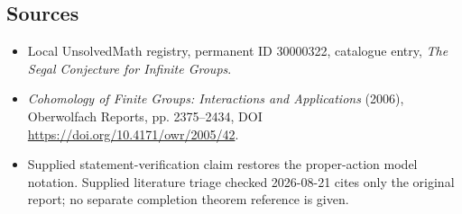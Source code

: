 \documentclass[11pt]{article}
\begin{document}
\subsection{Sources}
\begin{itemize}
\item Local UnsolvedMath registry, permanent ID 30000322, catalogue entry, \emph{The Segal Conjecture for Infinite Groups}.
\item \emph{Cohomology of Finite Groups: Interactions and Applications} (2006), Oberwolfach Reports, pp. 2375--2434, DOI \url{https://doi.org/10.4171/owr/2005/42}.
\item Supplied statement-verification claim restores the proper-action model notation. Supplied literature triage checked 2026-08-21 cites only the original report; no separate completion theorem reference is given.
\end{itemize}
\end{document}
